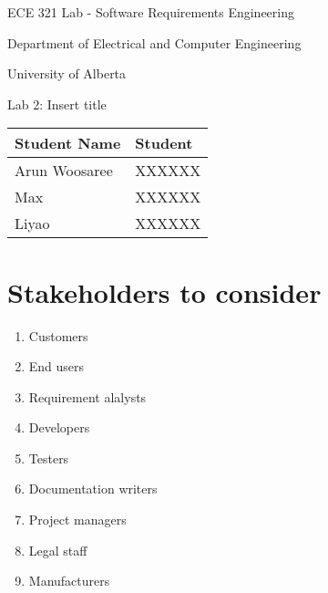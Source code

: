 \documentclass[letterpaper]{article}
\begin{document}
\begin{titlepage}
 \begin{center}

  \LARGE
  ECE 321 Lab - Software Requirements Engineering
  
  Department of Electrical and Computer Engineering
  
  University of Alberta
  
  \vspace{2cm}
  
  Lab 2: Insert title
  
  \vspace{5cm}
  \Large
  
  \begin{tabular}{ | m{5cm} | m{5cm} | }
   \hline
   Student Name  & Student \\
   \hline
   Arun Woosaree & XXXXXX  \\
   \hline
   Max           & XXXXXX  \\
   \hline
   Liyao         & XXXXXX  \\
   \hline
  \end{tabular}
  
  
  
  
 \end{center}
\end{titlepage}


\tableofcontents

\newpage

\section{Stakeholders to consider}
\label{stakeholders}
\begin{enumerate}
 \item Customers
 \item End users
 \item Requirement alalysts
 \item Developers
 \item Testers
 \item Documentation writers
 \item Project managers
 \item Legal staff
 \item Manufacturers
\end{enumerate}
\end{document}
